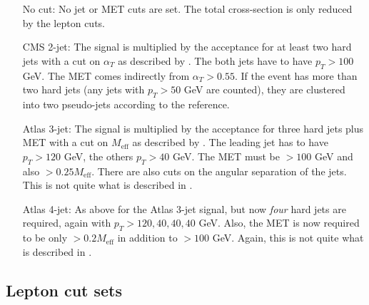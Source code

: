 \documentclass[10pt]{article}
\begin{document}
\begin{itemize}

\item[No cut:] No jet or MET cuts are set. The total cross-section is only
               reduced by the lepton cuts.

\item[CMS 2-jet:] The signal is multiplied by the acceptance for at least two
                  hard jets with a cut on ${\alpha}_{T}$ as described by
                  \cite{Khachatryan:2011tk}. The both jets have to have
                  $p_{T} > 100$ GeV.
                  The MET comes indirectly from ${\alpha}_{T} > 0.55$.
                  If the event has more than two hard jets (any jets with
                  $p_{T} > 50$ GeV are counted), they are clustered
                  into two pseudo-jets according to the reference.

\item[Atlas 3-jet:] The signal is multiplied by the acceptance for three hard
                    jets plus MET with a cut on $M_{\text{eff}}$ as described by
                    \cite{ATLAS:1278474}. The leading jet has to
                    have $p_{T} > 120$ GeV, the others
                    $p_{T} > 40$ GeV. The MET must be $> 100 $ GeV and also
                    $>0.25 M_{\text{eff}}$. There are also cuts on the angular
                    separation of the jets.
                    This is not quite what is described in \cite{ATLAS:1278474}.

\item[Atlas 4-jet:] As above for the Atlas 3-jet signal, but now {\em{four}}
                    hard jets are required, again with
                    $p_{T} > 120, 40, 40, 40$ GeV. Also, the MET is now required
                    to be only $> 0.2 M_{\text{eff}}$ in addition to
                    $> 100 $ GeV. Again,
                    this is not quite what is described in \cite{ATLAS:1278474}.


\end{itemize}


\subsection{Lepton cut sets}
\label{subsec:leptonSets}
\end{document}
